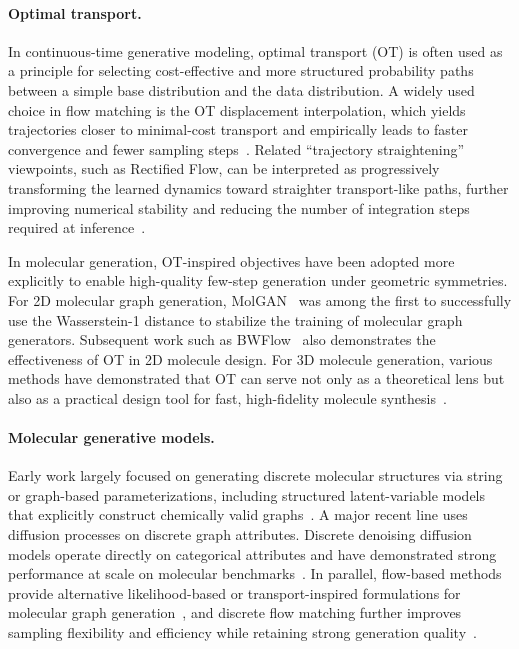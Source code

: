 \documentclass{article}
\theoremstyle{plain}
\theoremstyle{definition}
\theoremstyle{remark}
\newcommand{\1}{\mathbf{1}}
\begin{document}
\paragraph{Optimal transport.} In continuous-time generative modeling, optimal transport (OT) is often used as a principle for selecting cost-effective and more structured probability paths between a simple base distribution and the data distribution. A widely used choice in flow matching is the OT displacement interpolation, which yields trajectories closer to minimal-cost transport and empirically leads to faster convergence and fewer sampling steps~\citep{lipman2022flow}. Related ``trajectory straightening'' viewpoints, such as Rectified Flow, can be interpreted as progressively transforming the learned dynamics toward straighter transport-like paths, further improving numerical stability and reducing the number of integration steps required at inference~\citep{liu2022flow,tong2024improvinggeneralizingflowbasedgenerative,kornilov2024optimalflowmatchinglearning}.

In molecular generation, OT-inspired objectives have been adopted more explicitly to enable high-quality few-step generation under geometric symmetries. For 2D molecular graph generation, MolGAN~\citep{decao2022molganimplicitgenerativemodel} was among the first to successfully use the Wasserstein-1 distance to stabilize the training of molecular graph generators. Subsequent work such as BWFlow~\citep{jiang2025bureswassersteinflowmatchinggraph} also demonstrates the effectiveness of OT in 2D molecule design. For 3D molecule generation, various methods have demonstrated that OT can serve not only as a theoretical lens but also as a practical design tool for fast, high-fidelity molecule synthesis~\citep{song2024equivariant, tian2024equiflowequivariantconditionalflow,hong2025accelerating3dmoleculegeneration}.


\paragraph{Molecular generative models.}

Early work largely focused on generating discrete molecular structures via string or graph-based parameterizations, including structured latent-variable models that explicitly construct chemically valid graphs~\citep{jin2019junctiontreevariationalautoencoder,simonovsky2018graphvaegenerationsmallgraphs, jang2023hierarchical}. A major recent line uses diffusion processes on discrete graph attributes. Discrete denoising diffusion models operate directly on categorical attributes and have demonstrated strong performance at scale on molecular benchmarks~\citep{vignac2022digress}. In parallel, flow-based methods provide alternative likelihood-based or transport-inspired formulations for molecular graph generation~\citep{luo2021graphdfdiscreteflowmodel,shi2020graphafflowbasedautoregressivemodel}, and discrete flow matching further improves sampling flexibility and efficiency while retaining strong generation quality~\citep{qin2024defog,hou2024improvingmoleculargraphgeneration,lee2025fragfmhierarchicalframeworkefficient,chen2023efficient,luo2023fast}.
\end{document}
